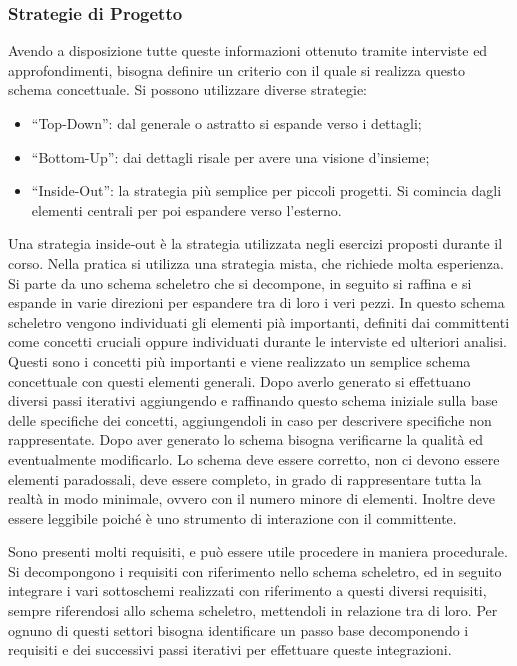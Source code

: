 \documentclass{article}
\numberwithin{equation}{subsection}
\begin{document}
\subsubsection{Strategie di Progetto}

Avendo a disposizione tutte queste informazioni ottenuto tramite interviste ed 
approfondimenti, bisogna definire un criterio con il quale si realizza questo schema 
concettuale. Si possono utilizzare diverse strategie:
\begin{itemize}
    \item ``Top-Down'': dal generale o astratto si espande verso i dettagli;
    \item ``Bottom-Up'': dai dettagli risale per avere una visione d'insieme;
    \item ``Inside-Out'': la strategia più semplice per piccoli progetti. Si comincia dagli elementi centrali per poi espandere verso l'esterno. 
\end{itemize}

Una strategia inside-out è la strategia utilizzata negli esercizi proposti durante il corso. 
Nella pratica si utilizza una strategia mista, che richiede molta esperienza. Si parte da 
uno schema scheletro che si decompone, in seguito si raffina e si espande in varie direzioni per 
espandere tra di loro i veri pezzi. In questo schema scheletro vengono individuati gli 
elementi pià importanti, definiti dai committenti come concetti cruciali oppure individuati durante le interviste ed ulteriori analisi. Questi sono i concetti più importanti e viene realizzato 
un semplice schema concettuale con questi elementi generali. Dopo averlo generato si effettuano diversi passi iterativi aggiungendo e raffinando questo schema iniziale sulla base delle 
specifiche dei concetti, aggiungendoli in caso per descrivere specifiche non rappresentate. 
Dopo aver generato lo schema bisogna verificarne la qualità ed eventualmente modificarlo. Lo schema deve essere corretto, non ci devono essere elementi paradossali, deve essere completo, in 
grado di rappresentare tutta la realtà in modo minimale, ovvero con il numero minore di elementi. Inoltre deve essere leggibile poiché è uno strumento di interazione con il committente. 

Sono presenti molti requisiti, e può essere utile procedere in maniera procedurale. Si decompongono i requisiti con riferimento nello schema scheletro, ed in seguito integrare i vari 
sottoschemi realizzati con riferimento a questi diversi requisiti, sempre riferendosi allo schema scheletro, mettendoli in relazione tra di loro. Per ognuno di questi settori bisogna identificare 
un passo base decomponendo i requisiti e dei successivi passi iterativi per effettuare queste integrazioni. 
\end{document}
